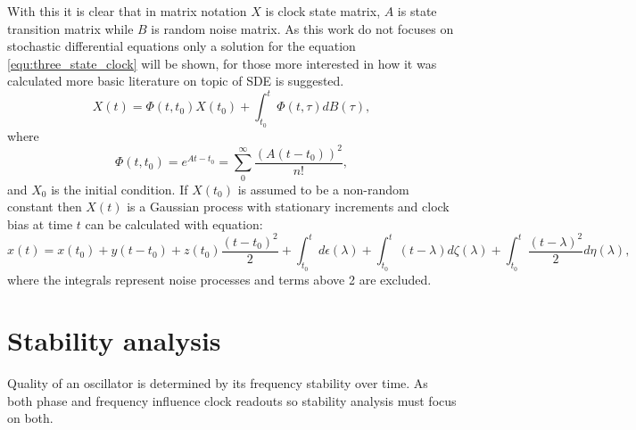 With this it is clear that in matrix notation $X$ is clock state matrix, $A$ is state transition
matrix while $B$ is random noise matrix.
As this work do not focuses on stochastic differential equations only a solution for the equation
\ref{equ:three_state_clock} will be shown, for those more interested in how it was calculated 
more basic literature on topic of SDE is suggested.
\begin{equation}
	\label{equ:clock_solved}
	X(t) = \Phi(t,t_{0})X(t_{0}) + \int^{t}_{t_0}\Phi(t,\tau)dB(\tau),
\end{equation}
where
\begin{equation}
	\label{equ:what_is_phi}
	\Phi(t,t_{0}) = e^{At-t_{0}} = \sum^{\infty}_{0}\frac{(A(t-t_{0}))^2}{n!},
\end{equation}
and $X_{0}$ is the initial condition.
If $X(t_{0})$ is assumed to be a non-random constant then $X(t)$ is a Gaussian process with 
stationary increments and clock bias at time $t$ can be calculated with equation:
\begin{equation}
	\label{equ:bias_final}
	x(t)=x(t_{0}) + y(t-t_{0}) + z(t_{0})\frac{(t-t_{0})^2}{2} + \int^{t}_{t_{0}}d\epsilon(\lambda)
	+ \int^{t}_{t_{0}}(t-\lambda)d\zeta(\lambda) 
	+ \int^{t}_{t_{0}}\frac{(t-\lambda)^2}{2}d\eta(\lambda),
\end{equation}
where the integrals represent noise processes and terms above 2 are excluded.

\section{Stability analysis}
Quality of an oscillator is determined by its frequency stability over time. 
As both phase and frequency influence clock readouts so stability analysis must focus on both.


